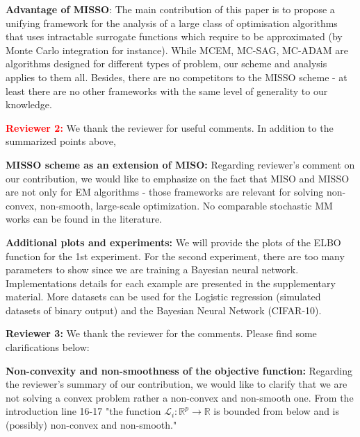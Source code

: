 \documentclass{article}
\begin{document}
\textbf{Advantage of MISSO}: The main contribution of this paper is to propose a unifying framework for the analysis of a large class of optimisation algorithms that uses intractable surrogate functions which require to be approximated (by Monte Carlo integration for instance).
While MCEM, MC-SAG, MC-ADAM are algorithms designed for different types of problem, our scheme and analysis applies to them all.
Besides, there are no competitors to the MISSO scheme - at least there are no other frameworks with the same level of generality to our knowledge.

\textbf{\textcolor{red}{Reviewer 2:}} We thank the reviewer for useful comments. In addition to the summarized points above,

\textbf{MISSO scheme as an extension of MISO:} Regarding reviewer's comment on our contribution, we would like to emphasize on the fact that MISO and MISSO are not only for EM algorithms - those frameworks are relevant for solving non-convex, non-smooth, large-scale optimization.
No comparable stochastic MM works can be found in the literature.



\textbf{Additional plots and experiments:} We will provide the plots of the ELBO function for the 1st experiment. For the second experiment, there are too many parameters to show since we are training a Bayesian neural network.
Implementations details for each example are presented in the supplementary material. 
More datasets can be used for the Logistic regression (simulated datasets of binary output) and the Bayesian Neural Network (CIFAR-10). 

\textbf{\textcolor{green!50!black}{Reviewer 3:}} We thank the reviewer for the comments. Please find some clarifications below:

\textbf{Non-convexity and non-smoothness of the objective function:} Regarding the reviewer's summary of our contribution, we would like to clarify that we are not solving a convex problem rather a non-convex and non-smooth one.
From the introduction line 16-17  "the function $\mathcal{L}_i:  \mathbb{R}^p \to \mathbb{R}$ is bounded from below and is (possibly) non-convex and non-smooth."
\end{document}

